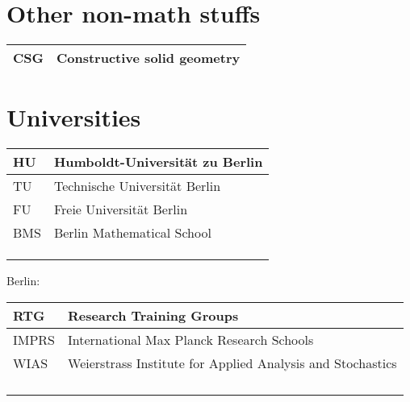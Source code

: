 \documentclass{amsart}
\numberwithin{equation}{section}
\theoremstyle{plain}
\numberwithin{equation}{section}
\theoremstyle{remark}
\begin{document}
\section{Other non-math stuffs}
\begin{longtable}{l|l}
\hline
CSG & Constructive solid geometry\\ \hline
\end{longtable}


\section{Universities}
\begin{longtable}{l|l}
\hline
HU & Humboldt-Universität zu Berlin \\ \hline
TU & Technische Universität Berlin  \\ \hline
FU & Freie Universität Berlin\\ \hline
BMS & Berlin Mathematical School\\ \hline
 & \\ \hline
 & \\ \hline
 & \\ \hline
\end{longtable}

Berlin:
\begin{longtable}{l|l}
\hline
RTG & Research Training Groups \\ \hline
IMPRS & International Max Planck Research Schools  \\ \hline
WIAS & Weierstrass Institute for Applied Analysis and Stochastics\\ \hline
 & \\ \hline
 & \\ \hline
 & \\ \hline
 & \\ \hline
\end{longtable}
\end{document}
